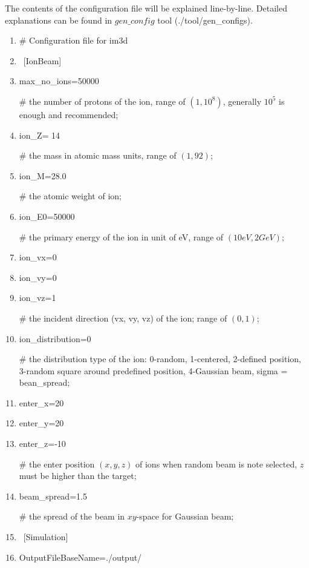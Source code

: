 The contents of the configuration file will be explained line-by-line. Detailed explanations can be found in $gen\_config$ tool (./tool/gen\_configs).

\begin{enumerate}[1:~]
\item \# Configuration file for im3d

\item ~[IonBeam]
\item max\_no\_ions=50000

\# the number of protons of the ion, range of $(1, 10^8)$, generally $10^5$ is enough and recommended;

\item ion\_Z= 14

\# the mass in atomic mass units, range of $(1, 92)$;

\item ion\_M=28.0

\# the atomic weight of ion;

\item ion\_E0=50000

\# the primary energy of the ion in unit of eV, range of $(10 eV, 2 GeV)$;

\item ion\_vx=0
\item ion\_vy=0
\item ion\_vz=1

\# the incident direction (vx, vy, vz) of the ion; range of $(0, 1)$;

\item ion\_distribution=0

\# the distribution type of the ion: 0-random, 1-centered, 2-defined position, 3-random square around predefined position, 4-Gaussian beam, sigma = bean\_spread;

\item enter\_x=20
\item enter\_y=20
\item enter\_z=-10

\# the enter position $(x, y, z)$ of ions when random beam is note selected, $z$ must be higher than the target;

\item beam\_spread=1.5

\# the spread of the beam in $xy$-space for Gaussian beam;

\item ~[Simulation]
\item OutputFileBaseName=./output/


\end{enumerate}
